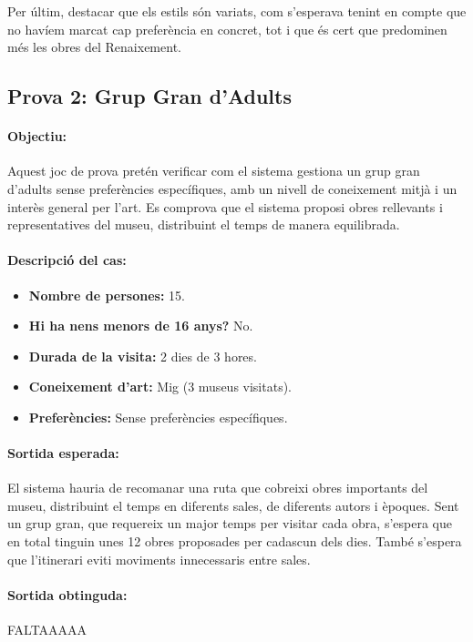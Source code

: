 \documentclass[a4paper]{article}
\begin{document}
	Per últim, destacar que els estils són variats, com s'esperava tenint en compte que no havíem marcat cap preferència en concret, tot i que és cert que predominen més les obres del Renaixement.
	
	\subsection{Prova 2: Grup Gran d’Adults}
	
	\paragraph{Objectiu:} 
	Aquest joc de prova pretén verificar com el sistema gestiona un grup gran d’adults sense preferències específiques, amb un nivell de coneixement mitjà i un interès general per l’art. Es comprova que el sistema proposi obres rellevants i representatives del museu, distribuint el temps de manera equilibrada.
	
	\paragraph{Descripció del cas:} 
	
	\begin{itemize}
		\item \textbf{Nombre de persones:} 15.
		\item \textbf{Hi ha nens menors de 16 anys?} No.
		\item \textbf{Durada de la visita:} 2 dies de 3 hores.
		\item \textbf{Coneixement d’art:} Mig (3 museus visitats).
		\item \textbf{Preferències:} Sense preferències específiques.
	\end{itemize}
	
	\paragraph{Sortida esperada:}
	El sistema hauria de recomanar una ruta que cobreixi obres importants del museu, distribuint el temps en diferents sales, de diferents autors i èpoques. Sent un grup gran, que requereix un major temps per visitar cada obra, s'espera que en total tinguin unes 12 obres proposades per cadascun dels dies. També s’espera que l’itinerari eviti moviments innecessaris entre sales.
	
	\paragraph{Sortida obtinguda:} FALTAAAAA
	
\end{document}
